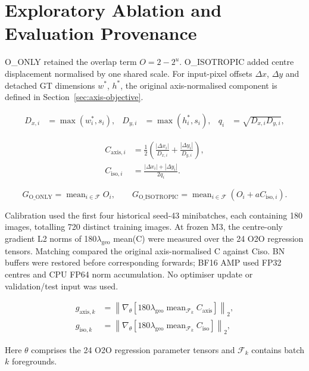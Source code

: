\section{Exploratory Ablation and Evaluation Provenance}
\label{Ablation}

O\_ONLY retained the overlap term \(O=2-2^u\). O\_ISOTROPIC added centre displacement normalised by one shared scale. For input-pixel offsets \(\Delta x\), \(\Delta y\) and detached GT dimensions \(w^*\), \(h^*\), the original axis-normalised component is defined in Section~\ref{sec:axis-objective}.

\begin{align}
 D_{x,i}&=\max(w_i^*,s_i), & D_{y,i}&=\max(h_i^*,s_i), & q_i&=\sqrt{D_{x,i}D_{y,i}},
\end{align}

\begin{align}
 C_{\mathrm{axis},i}&=\frac{1}{2}\left(\frac{|\Delta x_i|}{D_{x,i}}+\frac{|\Delta y_i|}{D_{y,i}}\right),\\
 C_{\mathrm{iso},i}&=\frac{|\Delta x_i|+|\Delta y_i|}{2q_i}.
\end{align}

\begin{equation}
 G_{\mathrm{O\_ONLY}}=\operatorname{mean}_{i\in\mathcal F}O_i,
 \qquad
 G_{\mathrm{O\_ISOTROPIC}}=\operatorname{mean}_{i\in\mathcal F}(O_i+aC_{\mathrm{iso},i}).
\end{equation}

Calibration used the first four historical seed-43 minibatches, each containing 180 images, totalling 720 distinct training images. At frozen M3, the centre-only gradient L2 norms of 180\(\lambda_{\mathrm{geo}}\) mean(C) were measured over the 24 O2O regression tensors. Matching compared the original axis-normalised C against Ciso. BN buffers were restored before corresponding forwards; BF16 AMP used FP32 centres and CPU FP64 norm accumulation. No optimiser update or validation/test input was used.

\begin{align}
 g_{\mathrm{axis},k}&=\left\|\nabla_\theta\left[180\lambda_{\mathrm{geo}}\operatorname{mean}_{\mathcal F_k}C_{\mathrm{axis}}\right]\right\|_2,\\
 g_{\mathrm{iso},k}&=\left\|\nabla_\theta\left[180\lambda_{\mathrm{geo}}\operatorname{mean}_{\mathcal F_k}C_{\mathrm{iso}}\right]\right\|_2,
\end{align}

Here $\theta$ comprises the 24 O2O regression parameter tensors and $\mathcal F_k$ contains batch $k$ foregrounds.

